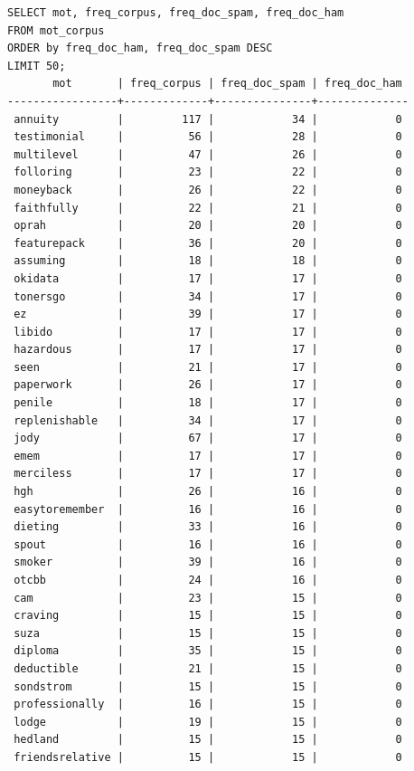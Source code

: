 \documentclass[a4paper,12pt]{article}
\begin{document}
	\begin{verbatim}
SELECT mot, freq_corpus, freq_doc_spam, freq_doc_ham 
FROM mot_corpus
ORDER by freq_doc_ham, freq_doc_spam DESC
LIMIT 50;
       mot       | freq_corpus | freq_doc_spam | freq_doc_ham 
-----------------+-------------+---------------+--------------
 annuity         |         117 |            34 |            0
 testimonial     |          56 |            28 |            0
 multilevel      |          47 |            26 |            0
 folloring       |          23 |            22 |            0
 moneyback       |          26 |            22 |            0
 faithfully      |          22 |            21 |            0
 oprah           |          20 |            20 |            0
 featurepack     |          36 |            20 |            0
 assuming        |          18 |            18 |            0
 okidata         |          17 |            17 |            0
 tonersgo        |          34 |            17 |            0
 ez              |          39 |            17 |            0
 libido          |          17 |            17 |            0
 hazardous       |          17 |            17 |            0
 seen            |          21 |            17 |            0
 paperwork       |          26 |            17 |            0
 penile          |          18 |            17 |            0
 replenishable   |          34 |            17 |            0
 jody            |          67 |            17 |            0
 emem            |          17 |            17 |            0
 merciless       |          17 |            17 |            0
 hgh             |          26 |            16 |            0
 easytoremember  |          16 |            16 |            0
 dieting         |          33 |            16 |            0
 spout           |          16 |            16 |            0
 smoker          |          39 |            16 |            0
 otcbb           |          24 |            16 |            0
 cam             |          23 |            15 |            0
 craving         |          15 |            15 |            0
 suza            |          15 |            15 |            0
 diploma         |          35 |            15 |            0
 deductible      |          21 |            15 |            0
 sondstrom       |          15 |            15 |            0
 professionally  |          16 |            15 |            0
 lodge           |          19 |            15 |            0
 hedland         |          15 |            15 |            0
 friendsrelative |          15 |            15 |            0

\end{verbatim}
\end{document}
